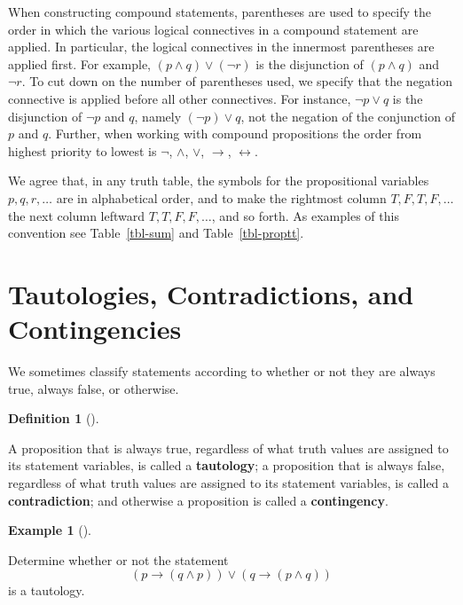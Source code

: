 \documentclass[
  letterpaper,
  10pt,
  reqno,
  twopage,
  openany]{book}
\theoremstyle{plain}
\theoremstyle{definition}
\theoremstyle{definition}
\newtheorem{definition}{Definition}[chapter]
\theoremstyle{definition}
\newtheorem{example}{Example}[chapter]
\theoremstyle{plain}
\theoremstyle{plain}
\theoremstyle{remark}
\begin{document}
When constructing compound statements, parentheses are used to specify
the order in which the various logical connectives in a compound
statement are applied. In particular, the logical connectives in the
innermost parentheses are applied first. For example,
\((p\land q)\lor (\neg r)\) is the disjunction of \((p\land q)\) and
\(\neg r\). To cut down on the number of parentheses used, we specify
that the negation connective is applied before all other connectives.
For instance, \(\neg p\lor q\) is the disjunction of \(\neg p\) and
\(q\), namely \((\neg p)\lor q\), not the negation of the conjunction of
\(p\) and \(q\). Further, when working with compound propositions the
order from highest priority to lowest is \(\neg\), \(\land\), \(\lor\),
\(\rightarrow\), \(\leftrightarrow\).

We agree that, in any truth table, the symbols for the propositional
variables \(p, q, r, \ldots\) are in alphabetical order, and to make the
rightmost column \(T, F, T, F, \ldots\) the next column leftward
\(T, T, F, F, \ldots\), and so forth. As examples of this convention see
Table~\ref{tbl-sum} and Table~\ref{tbl-proptt}.

\hypertarget{tautologies-contradictions-and-contingencies}{%
\section{Tautologies, Contradictions, and
Contingencies}\label{tautologies-contradictions-and-contingencies}}

We sometimes classify statements according to whether or not they are
always true, always false, or otherwise.

\leavevmode{}%
\begin{definition}[]\label{def-tcc}

A proposition that is always true, regardless of what truth values are
assigned to its statement variables, is called a 
\textbf{tautology}; a proposition that is always false, regardless of
what truth values are assigned to its statement variables, is called a
 \textbf{contradiction}; and otherwise a
proposition is called a  \textbf{contingency}.

\end{definition}

\leavevmode{}%
\begin{example}[]\label{exm-tautology}

Determine whether or not the statement \[
(p\rightarrow (q\land p))\lor (q\rightarrow (p\land q))
\] is a tautology.

\end{example}
\end{document}
